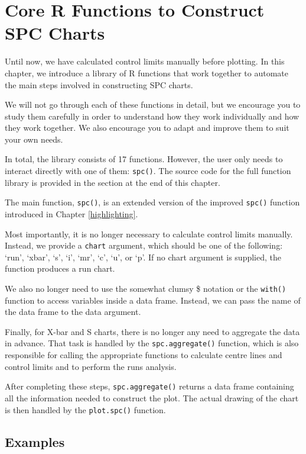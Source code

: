 \documentclass[
]{book}
\begin{document}
\chapter{Core R Functions to Construct SPC Charts}\label{r-functions}

Until now, we have calculated control limits manually before plotting. In this chapter, we introduce a library of R functions that work together to automate the main steps involved in constructing SPC charts.

We will not go through each of these functions in detail, but we encourage you to study them carefully in order to understand how they work individually and how they work together. We also encourage you to adapt and improve them to suit your own needs.

In total, the library consists of 17 functions. However, the user only needs to interact directly with one of them: \texttt{spc()}. The source code for the full function library is provided in the section at the end of this chapter.

The main function, \texttt{spc()}, is an extended version of the improved \texttt{spc()} function introduced in Chapter \ref{highlighting}.

Most importantly, it is no longer necessary to calculate control limits manually. Instead, we provide a \texttt{chart} argument, which should be one of the following: `run', `xbar', `s', `i', `mr', `c', `u', or `p'. If no chart argument is supplied, the function produces a run chart.

We also no longer need to use the somewhat clumsy \$ notation or the \texttt{with()} function to access variables inside a data frame. Instead, we can pass the name of the data frame to the data argument.

Finally, for X-bar and S charts, there is no longer any need to aggregate the data in advance. That task is handled by the \texttt{spc.aggregate()} function, which is also responsible for calling the appropriate functions to calculate centre lines and control limits and to perform the runs analysis.

After completing these steps, \texttt{spc.aggregate()} returns a data frame containing all the information needed to construct the plot. The actual drawing of the chart is then handled by the \texttt{plot.spc()} function.

\section{Examples}\label{examples}
\end{document}
